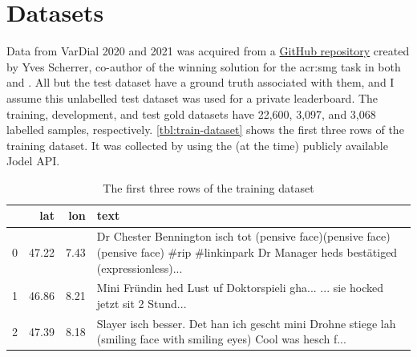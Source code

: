 \section{Datasets}
\label{sec:datasets}

Data from VarDial 2020 and 2021 was acquired from a \href{https://github.com/yvesscherrer/vardial-shared-tasks}{GitHub repository} created by Yves Scherrer, co-author of the winning solution for the \gls{acr:smg} task in both \citeyear{scherrerHeLjuVarDial20202020} and \citeyear{scherrerSocialMediaVariety2021}. All but the test dataset have a ground truth associated with them, and I assume this unlabelled test dataset was used for a private leaderboard. The training, development, and test gold datasets have 22,600, 3,097, and 3,068 labelled samples, respectively. \autoref{tbl:train-dataset} shows the first three rows of the training dataset. It was collected by \cite[2-3]{hovyCapturingRegionalVariation2018} using the (at the time) publicly available Jodel API.

\begin{table}
    \centering
    \begin{tabular}{l|rr|p{}}
        \toprule
          & lat   & lon  & text                                                                                                                                        \\
        \midrule
        0 & 47.22 & 7.43 & Dr Chester Bennington isch tot (pensive face)(pensive face)(pensive face) \#rip \#linkinpark Dr Manager heds bestätiged (expressionless)... \\
        1 & 46.86 & 8.21 & Mini Fründin hed Lust uf Doktorspieli gha... ... sie hocked jetzt sit 2 Stund...                                                            \\
        2 & 47.39 & 8.18 & Slayer isch besser. Det han ich gescht mini Drohne stiege lah (smiling face with smiling eyes) Cool was hesch f...                          \\
        \bottomrule
    \end{tabular}
    \caption{The first three rows of the training dataset}
    \label{tbl:train-dataset}
\end{table}

